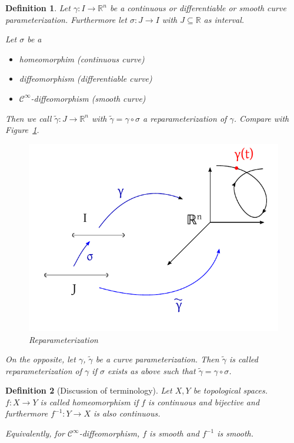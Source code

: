 \documentclass{article}
\newtheorem{definition}{Definition}  \numberwithin{definition}{section}
\begin{document}
\begin{definition} %
  Let $\gamma: I \to \mathbb R^n$ be a continuous or differentiable or smooth curve parameterization.
  Furthermore let $\sigma: J \to I$ with $J \subseteq \mathbb R$ as interval.

  Let $\sigma$ be a
  \begin{itemize}
    \item homeomorphim (continuous curve)
    \item diffeomorphism (differentiable curve)
    \item $\mathcal C^\infty$-diffeomorphism (smooth curve)
  \end{itemize}
  Then we call $\tilde \gamma: J \to \mathbb R^n$ with $\tilde \gamma = \gamma \circ \sigma$ a \emph{reparameterization} of $\gamma$.
  Compare with Figure~\ref{img:reparam}.

  \begin{figure}[t]
    \begin{center}
      \includegraphics{img/40_reparameterization.pdf} %
      \caption{Reparameterization}
      \label{img:reparam}
    \end{center}
  \end{figure}

  On the opposite, let $\gamma$, $\tilde \gamma$ be a curve parameterization. Then $\tilde\gamma$ is called reparameterization of $\gamma$ if $\sigma$ exists as above such that $\tilde \gamma = \gamma \circ \sigma$.
\end{definition}

\begin{definition}[Discussion of terminology]
  Let $X, Y$ be topological spaces. $f: X \to Y$ is called \emph{homeomorphism}
  if $f$ is continuous and bijective and furthermore $f^{-1}: Y \to X$ is also continuous.

  Equivalently, for $\mathcal C^\infty$-diffeomorphism, $f$ is smooth and $f^{-1}$ is smooth.
\end{definition}
\end{document}
